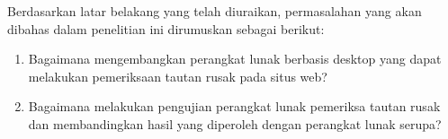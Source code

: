 Berdasarkan latar belakang yang telah diuraikan, permasalahan yang akan dibahas dalam penelitian ini dirumuskan sebagai berikut:

\begin{enumerate}

    \item Bagaimana mengembangkan perangkat lunak berbasis desktop yang dapat melakukan pemeriksaan tautan rusak pada situs web?
    
    \item Bagaimana melakukan pengujian perangkat lunak pemeriksa tautan rusak dan membandingkan hasil yang diperoleh dengan perangkat lunak serupa?
    
\end{enumerate}